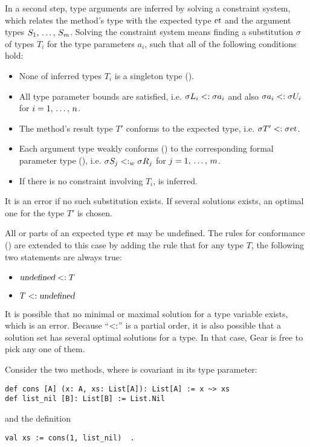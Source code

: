 In a second step, type arguments are inferred by solving a constraint system, which relates the method's type with the expected type $\mbox{\sl et}$ and the argument types $S_1 ,\, \ldots ,\, S_m$. Solving the constraint system means finding a substitution $\sigma$ of types $T_i$ for the type parameters $a_i$, such that all of the following conditions hold:
\begin{itemize}
  \item None of inferred types $T_i$ is a singleton type (). %
  \item All type parameter bounds are satisfied, i.e. $\sigma L_i <: \sigma a_i$ and also $\sigma a_i <: \sigma U_i$ for $i = 1 ,\, \ldots ,\, n$. 
  \item The method's result type $T'$ conforms to the expected type, i.e. $\sigma T' <: \sigma \mbox{\sl et}$. 
  \item Each argument type weakly conforms () to the corresponding formal parameter type (), i.e. $\sigma S_j <: _w \sigma R_j$ for $j = 1 ,\, \ldots ,\, m$. 
  \item If there is no constraint involving $T_i$,  is inferred. 
\end{itemize}

It is an error if no such substitution exists. If several solutions exists, an optimal one for the type $T'$ is chosen. 

All or parts of an expected type $\mbox{\sl et}$ may be undefined. The rules for conformance () are extended to this case by adding the rule that for any type $T$, the following two statements are always true:
\begin{itemize}
  \item $\mbox{\sl undefined} <: T$
  \item $T <: \mbox{\sl undefined}$
\end{itemize}

It is possible that no minimal or maximal solution for a type variable exists, which is an error. Because ``$<:$'' is a partial order, it is also possible that a solution set has several optimal solutions for a type. In that case, Gear is free to pick any one of them. 

\example Consider the two methods, where  is covariant in its type parameter:
\begin{lstlisting}
def cons [A] (x: A, xs: List[A]): List[A] := x ~> xs
def list_nil [B]: List[B] := List.Nil
\end{lstlisting}
and the definition
\begin{lstlisting}
val xs := cons(1, list_nil)  .
\end{lstlisting}

